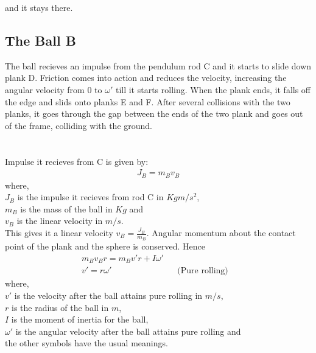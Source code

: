 \documentclass[11pt]{article}
\begin{document}
and it stays there.

\pagebreak

\subsection{The Ball B}
The ball recieves an impulse from the pendulum rod C and it starts to slide down plank D. Friction comes into action and reduces the velocity, increasing the angular velocity from $0$ to $\omega '$ till it starts rolling. When the plank ends, it falls off the edge and slids onto planks E and F. \cite{halliday} After several collisions with the two planks, it goes through the gap between the ends of the two plank and goes out of the frame, colliding with the ground.\\
\\
\setlength\fboxsep{2pt}
\setlength\fboxrule{1pt}
\\

Impulse it recieves from C is given by:
\begin{align}
J_B = m_B v_B
\end{align}
where,\\
$J_B$ is the impulse it recieves from rod C in $Kg m/s^2$,\\
$m_B$ is the mass of the ball in $Kg$ and\\
$v_B$ is the linear velocity in $m/s$.\\

This gives it a linear velocity $v_B = \frac{J_B}{m_B}$. Angular momentum about the contact point of the plank and the sphere is conserved. Hence
\begin{align}
m_B v_B r = m_B v'r + I\omega '
\\
v' = r\omega ' &&\mbox{(Pure rolling)}&
\end{align}
where,\\
$v'$ is the velocity after the ball attains pure rolling in $m/s$,\\
$r$ is the radius of the ball in $m$,\\
$I$ is the moment of inertia for the ball,\\
$\omega '$ is the angular velocity after the ball attains pure rolling and\\
the other symbols have the usual meanings.\\
\end{document}
